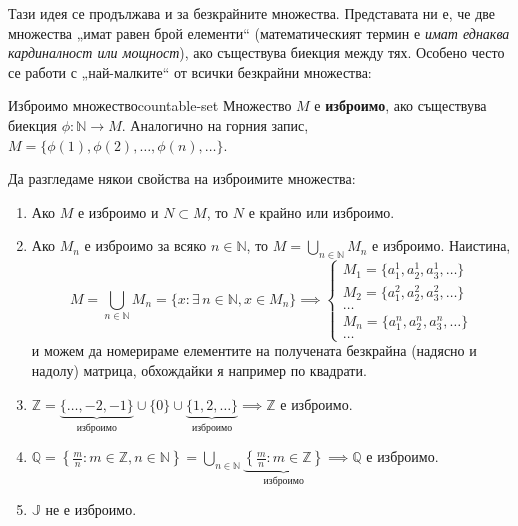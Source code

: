 Тази идея се продължава и за безкрайните множества. Представата ни е, че две множества „имат равен брой елементи“ (математическият термин е \emph{имат еднаква кардиналност или мощност}), ако съществува биекция между тях. Особено често се работи с „най-малките“ от всички безкрайни множества:

\begin{definition}{Изброимо множество}{countable-set}
Множество $M$ е \textbf{изброимо}, ако съществува биекция $\phi : \mathbb{N} \to M$. Аналогично на горния запис, $M = \{\phi(1), \phi(2), \dots, \phi(n), \dots\}$.
\end{definition}

Да разгледаме някои свойства на изброимите множества:
\begin{enumerate}
    \item Ако $M$ е изброимо и $N \subset M$, то $N$ е крайно или изброимо.
    \item Ако $M_n$ е изброимо за всяко $n \in \mathbb{N}$, то $M = \bigcup_{n \in \mathbb{N}} M_n$ е изброимо. Наистина,
    \[
    M = \bigcup_{n \in \mathbb{N}} M_n = \{x : \exists\, n \in \mathbb{N}, x \in M_n\} \implies
    \begin{cases}
    M_1 = \{a_1^1, a_2^1, a_3^1, \dots\} \\
    M_2 = \{a_1^2, a_2^2, a_3^2, \dots\} \\
    \dots \\
    M_n = \{a_1^n, a_2^n, a_3^n, \dots\} \\
    \dots
    \end{cases}
    \]
    и можем да номерираме елементите на получената безкрайна (надясно и надолу) матрица, обхождайки я например по квадрати.
    \item $\mathbb{Z} = \underbrace{\{\dots, -2, -1\}}_{\text{изброимо}} \cup \{0\} \cup \underbrace{\{1, 2, \dots\}}_{\text{изброимо}} \implies \mathbb{Z}$ е изброимо.
    \item $\mathbb{Q} = \left\{\frac{m}{n} : m \in \mathbb{Z}, n \in \mathbb{N}\right\} = \bigcup_{n \in \mathbb{N}} \underbrace{\left\{\frac{m}{n} : m \in \mathbb{Z}\right\}}_{\text{изброимо}} \implies \mathbb{Q}$ е изброимо.
    \item $\mathbb{J}$ не е изброимо.
\end{enumerate}

